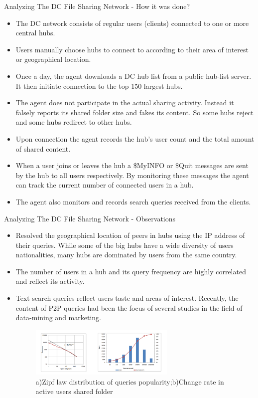 \documentclass[9pt]{beamer}
\begin{document}
\begin{frame}{Analyzing The DC File Sharing Network - How it was done?}
    \begin{itemize}
        \item The DC network consists of regular users (clients) connected to one or more central hubs.
        \item Users manually choose hubs to connect to according to their area of interest or geographical location.
        \item Once a day, the agent downloads a DC hub list from a public hub-list server. It then initiate connection to the top 150 largest hubs. 
        \item The agent does not participate in the actual sharing activity. Instead it falsely reports its shared folder size and fakes its content. So some hubs reject and some hubs redirect to other hubs.
        \item Upon connection the agent records the hub’s user count and the total amount of shared content. 
        \item When a user joins or leaves the hub a \$MyINFO or \$Quit messages are sent by the hub to all users respectively. By monitoring these messages the agent can track the current number of connected users in a hub.
        \item The agent also monitors and records search queries received from the clients.
    \end{itemize}
\end{frame}
\begin{frame}{Analyzing The DC File Sharing Network - Observations}
\begin{itemize}
  \item Resolved the geographical location of peers in hubs using the IP address of their queries. While some of the big hubs have a wide diversity of users nationalities, many hubs are dominated by users from the same country.
  \item The number of users in a hub and its query frequency are highly correlated and reflect its activity.
  \item Text search queries reflect users taste and areas of interest. Recently, the content of P2P queries had been the focus of several studies in the field of data-mining and marketing.
  \hfill \break
  \begin{figure}
      \centering
      \includegraphics[width=7cm]{correlation_sharedData.png}
      \caption{a)Zipf law distribution of queries popularity;b)Change rate in active users shared folder}
      \label{}
  \end{figure}
\end{itemize}
\end{frame}
\end{document}

